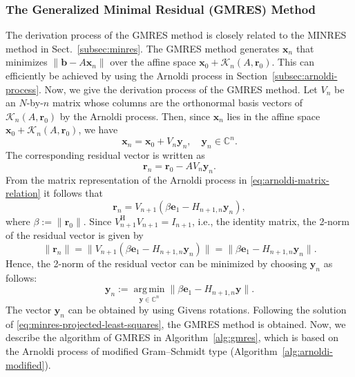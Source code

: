 \subsubsection{{The Generalized Minimal Residual (GMRES) Method}}\label{subsec:gmres-method}
{The derivation process of the GMRES method  is closely related to the MINRES method in Sect.\ \ref{subsec:minres}. The GMRES method generates $\bm x_n$ that minimizes $\|\bm b-A\bm x_n\|$ over the affine space $\bm x_0+\mathcal K_n(A,\bm r_0)$. This can efficiently be achieved by using the Arnoldi process in Section\ \ref{subsec:arnoldi-process}. Now, we give the derivation process of the GMRES method.}
{Let $V_n$ be an $N$-by-$n$ matrix whose columns are the orthonormal basis vectors of $\mathcal K_n(A,\bm r_0)$ by the Arnoldi process. Then, since $\bm x_n$ lies in the affine space $\bm x_0+\mathcal K_n(A,\bm r_0)$, we have}
\[\bm x_n=\bm x_0+V_n\bm y_n,\quad\bm y_n\in\mathbb C^n.\]
{The corresponding residual vector is written as}
\[\bm r_n=\bm r_0-AV_n\bm y_n.\]
{From the matrix representation of the Arnoldi process in \eqref{eq:arnoldi-matrix-relation} it follows that}
\begin{equation}\label{eq:gmres-projected-residual}\bm r_n=V_{n+1}(\beta\bm e_1-H_{n+1,n}\bm y_n),\end{equation}
{where $\beta:=\|\bm r_0\|$. Since $V_{n+1}^{\mathrm H}V_{n+1}=I_{n+1}$, i.e., the identity matrix, the 2-norm of the residual vector is given by}
\[\|\bm r_n\|=\|V_{n+1}(\beta\bm e_1-H_{n+1,n}\bm y_n)\|=\|\beta\bm e_1-H_{n+1,n}\bm y_n\|.\]
{Hence, the 2-norm of the residual vector can be minimized by choosing $\bm y_n$ as follows:}
\begin{equation}\label{eq:gmres-projected-minimization}\bm y_n:=\operatorname*{arg\,min}_{\bm y\in\mathbb C^n}\|\beta\bm e_1-H_{n+1,n}\bm y\|.\end{equation}
{The vector $\bm y_n$ can be obtained by using Givens rotations. Following the solution of \eqref{eq:minres-projected-least-squares}, the GMRES method is obtained. Now, we describe the algorithm of GMRES in Algorithm\ \ref{alg:gmres}, which is based on the Arnoldi process of modified Gram--Schmidt type (Algorithm\ \ref{alg:arnoldi-modified}).}
